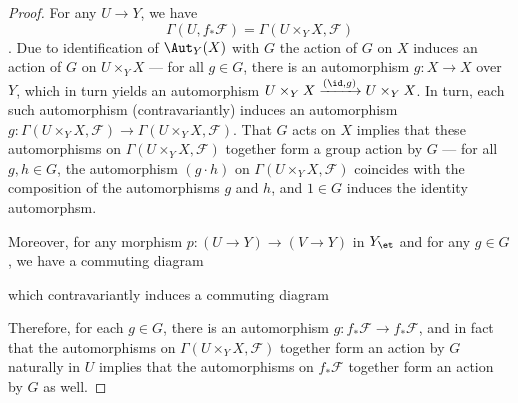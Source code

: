 \begin{proof}
    For any  $U \to Y$, we have 
    $$\Gamma(U, f_* \mathscr{F}) = \Gamma(U \times_Y X, \mathscr{F})$$
    . Due to identification of $\Aut_Y(X)$ with $G$ the action of $G$ on $X$ induces an action of $G$ on $U \times_Y X$ --- for all $g \in G$, there is an automorphism $g: X \to X$ over $Y$, which in turn yields an automorphism $U \times_Y X \xrightarrow{(\id, g)} U \times_Y X$. In turn, each such automorphism (contravariantly) induces an automorphism $g: \Gamma(U \times_Y X, \mathscr{F}) \to \Gamma(U \times_Y X, \mathscr{F})$. That $G$ acts on $X$ implies that these automorphisms on $\Gamma(U \times_Y X, \mathscr{F})$ together form a group action by $G$ --- for all $g, h \in G$, the automorphism $(g \cdot h)$ on $\Gamma(U \times_Y X, \mathscr{F})$ coincides with the composition of the automorphisms $g$ and $h$, and $1 \in G$ induces the identity automorphsm.

    Moreover, for any morphism $p: (U \to Y) \to (V \to Y)$ in $Y_{\et}$ and for any $g \in G$, we have a commuting diagram
    \begin{center}
    \end{center}
    which contravariantly induces a commuting diagram
    \begin{center}
    \end{center}
    Therefore, for each $g \in G$, there is an automorphism $g: f_* \mathscr{F} \to f_* \mathscr{F}$, and in fact that the automorphisms on $\Gamma(U \times_Y X, \mathscr{F})$ together form an action by $G$ naturally in $U$ implies that the automorphisms on $f_* \mathscr{F}$ together form an action by $G$ as well.


\end{proof}
